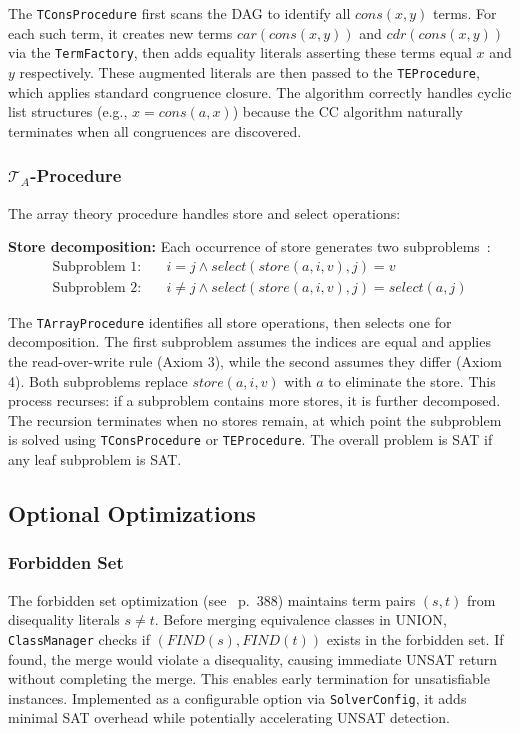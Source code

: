 \documentclass[11pt,a4paper]{article}
\begin{document}
The \texttt{TConsProcedure} first scans the DAG to identify all $cons(x, y)$ terms. For each such term, it creates new terms $car(cons(x, y))$ and $cdr(cons(x, y))$ via the \texttt{TermFactory}, then adds equality literals asserting these terms equal $x$ and $y$ respectively. These augmented literals are then passed to the \texttt{TEProcedure}, which applies standard congruence closure. The algorithm correctly handles cyclic list structures (e.g., $x = cons(a, x)$) because the CC algorithm naturally terminates when all congruences are discovered.

\subsubsection{$\mathcal{T}_A$-Procedure}

The array theory procedure handles store and select operations:

\textbf{Store decomposition:} Each occurrence of store generates two subproblems~\cite{bradley2007calculus}:
\begin{align}
    \text{Subproblem 1:} \quad & i = j \land select(store(a, i, v), j) = v \\
    \text{Subproblem 2:} \quad & i \neq j \land select(store(a, i, v), j) = select(a, j)
\end{align}

The \texttt{TArrayProcedure} identifies all store operations, then selects one for decomposition. The first subproblem assumes the indices are equal and applies the read-over-write rule (Axiom 3), while the second assumes they differ (Axiom 4). Both subproblems replace $store(a, i, v)$ with $a$ to eliminate the store. This process recurses: if a subproblem contains more stores, it is further decomposed. The recursion terminates when no stores remain, at which point the subproblem is solved using \texttt{TConsProcedure} or \texttt{TEProcedure}. The overall problem is SAT if any leaf subproblem is SAT.

\subsection{Optional Optimizations}

\subsubsection{Forbidden Set}

The forbidden set optimization (see~\cite{detlefs2005simplify} p.~388) maintains term pairs $(s, t)$ from disequality literals $s \neq t$. Before merging equivalence classes in UNION, \texttt{ClassManager} checks if $(FIND(s), FIND(t))$ exists in the forbidden set. If found, the merge would violate a disequality, causing immediate UNSAT return without completing the merge. This enables early termination for unsatisfiable instances. Implemented as a configurable option via \texttt{SolverConfig}, it adds minimal SAT overhead while potentially accelerating UNSAT detection.
\end{document}
